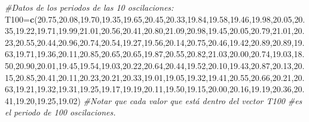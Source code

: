 \documentclass[
]{article}
\newenvironment{Shaded}{\begin{snugshade}}{\end{snugshade}}
\newcommand{\CommentTok}[1]{\textcolor[rgb]{0.56,0.35,0.01}{\textit{#1}}}
\newcommand{\FloatTok}[1]{\textcolor[rgb]{0.00,0.00,0.81}{#1}}
\newcommand{\FunctionTok}[1]{\textcolor[rgb]{0.13,0.29,0.53}{\textbf{#1}}}
\newcommand{\NormalTok}[1]{#1}
\newcommand{\OtherTok}[1]{\textcolor[rgb]{0.56,0.35,0.01}{#1}}
\begin{document}
\begin{Shaded}
\begin{Highlighting}[]
\CommentTok{\#Datos de los periodos de las 10 oscilaciones:}
\NormalTok{T100}\OtherTok{=}\FunctionTok{c}\NormalTok{(}\FloatTok{20.75}\NormalTok{,}\FloatTok{20.08}\NormalTok{,}\FloatTok{19.70}\NormalTok{,}\FloatTok{19.35}\NormalTok{,}\FloatTok{19.65}\NormalTok{,}\FloatTok{20.45}\NormalTok{,}\FloatTok{20.33}\NormalTok{,}\FloatTok{19.84}\NormalTok{,}\FloatTok{19.58}\NormalTok{,}\FloatTok{19.46}\NormalTok{,}\FloatTok{19.98}\NormalTok{,}\FloatTok{20.05}\NormalTok{,}\FloatTok{20.35}\NormalTok{,}\FloatTok{19.22}\NormalTok{,}\FloatTok{19.71}\NormalTok{,}\FloatTok{19.99}\NormalTok{,}\FloatTok{21.01}\NormalTok{,}\FloatTok{20.56}\NormalTok{,}\FloatTok{20.41}\NormalTok{,}\FloatTok{20.80}\NormalTok{,}\FloatTok{21.09}\NormalTok{,}\FloatTok{20.98}\NormalTok{,}\FloatTok{19.45}\NormalTok{,}\FloatTok{20.05}\NormalTok{,}\FloatTok{20.79}\NormalTok{,}\FloatTok{21.01}\NormalTok{,}\FloatTok{20.23}\NormalTok{,}\FloatTok{20.55}\NormalTok{,}\FloatTok{20.44}\NormalTok{,}\FloatTok{20.96}\NormalTok{,}\FloatTok{20.74}\NormalTok{,}\FloatTok{20.54}\NormalTok{,}\FloatTok{19.27}\NormalTok{,}\FloatTok{19.56}\NormalTok{,}\FloatTok{20.14}\NormalTok{,}\FloatTok{20.75}\NormalTok{,}\FloatTok{20.46}\NormalTok{,}\FloatTok{19.42}\NormalTok{,}\FloatTok{20.89}\NormalTok{,}\FloatTok{20.89}\NormalTok{,}\FloatTok{19.63}\NormalTok{,}\FloatTok{19.71}\NormalTok{,}\FloatTok{19.36}\NormalTok{,}\FloatTok{20.11}\NormalTok{,}\FloatTok{20.85}\NormalTok{,}\FloatTok{20.65}\NormalTok{,}\FloatTok{20.65}\NormalTok{,}\FloatTok{19.87}\NormalTok{,}\FloatTok{20.55}\NormalTok{,}\FloatTok{20.82}\NormalTok{,}\FloatTok{21.03}\NormalTok{,}\FloatTok{20.00}\NormalTok{,}\FloatTok{20.74}\NormalTok{,}\FloatTok{19.03}\NormalTok{,}\FloatTok{18.50}\NormalTok{,}\FloatTok{20.90}\NormalTok{,}\FloatTok{20.01}\NormalTok{,}\FloatTok{19.45}\NormalTok{,}\FloatTok{19.54}\NormalTok{,}\FloatTok{19.03}\NormalTok{,}\FloatTok{20.22}\NormalTok{,}\FloatTok{20.64}\NormalTok{,}\FloatTok{20.44}\NormalTok{,}\FloatTok{19.52}\NormalTok{,}\FloatTok{20.10}\NormalTok{,}\FloatTok{19.43}\NormalTok{,}\FloatTok{20.87}\NormalTok{,}\FloatTok{20.13}\NormalTok{,}\FloatTok{20.15}\NormalTok{,}\FloatTok{20.85}\NormalTok{,}\FloatTok{20.41}\NormalTok{,}\FloatTok{20.11}\NormalTok{,}\FloatTok{20.23}\NormalTok{,}\FloatTok{20.21}\NormalTok{,}\FloatTok{20.33}\NormalTok{,}\FloatTok{19.01}\NormalTok{,}\FloatTok{19.05}\NormalTok{,}\FloatTok{19.32}\NormalTok{,}\FloatTok{19.41}\NormalTok{,}\FloatTok{20.55}\NormalTok{,}\FloatTok{20.66}\NormalTok{,}\FloatTok{20.21}\NormalTok{,}\FloatTok{20.63}\NormalTok{,}\FloatTok{19.21}\NormalTok{,}\FloatTok{19.32}\NormalTok{,}\FloatTok{19.31}\NormalTok{,}\FloatTok{19.25}\NormalTok{,}\FloatTok{19.17}\NormalTok{,}\FloatTok{19.19}\NormalTok{,}\FloatTok{20.11}\NormalTok{,}\FloatTok{19.50}\NormalTok{,}\FloatTok{19.15}\NormalTok{,}\FloatTok{20.00}\NormalTok{,}\FloatTok{20.16}\NormalTok{,}\FloatTok{19.19}\NormalTok{,}\FloatTok{20.36}\NormalTok{,}\FloatTok{20.41}\NormalTok{,}\FloatTok{19.20}\NormalTok{,}\FloatTok{19.25}\NormalTok{,}\FloatTok{19.02}\NormalTok{)}
\CommentTok{\#Notar que cada valor que está dentro del vector T100}
\CommentTok{\#es el periodo de 100 oscilaciones.}


\end{Highlighting}
\end{Shaded}
\end{document}
